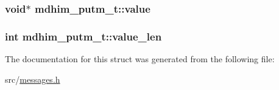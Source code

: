 \hypertarget{structmdhim__putm__t_adac45376bec0e989940d3a2b4a374daf}{
\subsubsection[{value}]{\setlength{\rightskip}{0pt plus 5cm}void$\ast$ mdhim\-\_\-putm\-\_\-t\-::value}}\label{structmdhim__putm__t_adac45376bec0e989940d3a2b4a374daf}
\hypertarget{structmdhim__putm__t_af8cba256ae6e9003d55bc640c41f41e1}{
\subsubsection[{value\-\_\-len}]{\setlength{\rightskip}{0pt plus 5cm}int mdhim\-\_\-putm\-\_\-t\-::value\-\_\-len}}\label{structmdhim__putm__t_af8cba256ae6e9003d55bc640c41f41e1}


The documentation for this struct was generated from the following file\-:\begin{DoxyCompactItemize}
\item 
src/\hyperlink{messages_8h}{messages.\-h}\end{DoxyCompactItemize}
